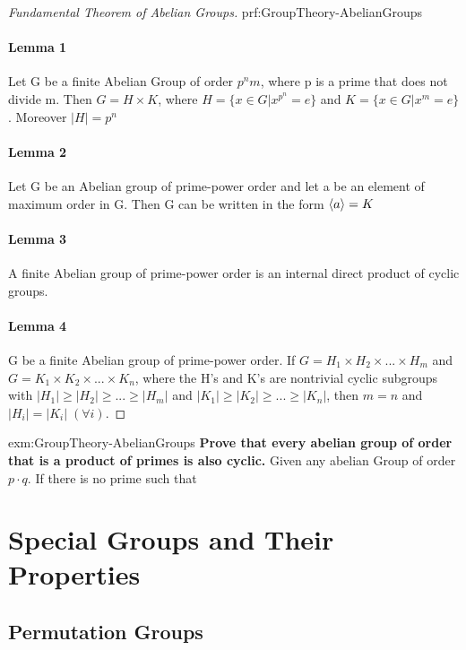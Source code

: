 \begin{proof}[Fundamental Theorem of Abelian Groups]{prf:GroupTheory-AbelianGroups}
    \paragraph{Lemma 1} Let G be a finite Abelian Group of order $p^n m$, where p is a prime that does not divide m. Then $ G = H \times K $, where $ H = \{ x \in G | x^{p^n} = e \} $ and $ K = \{ x \in G | x^{m} = e \} $. Moreover $ |H| = p^n $
    \paragraph{Lemma 2} Let G be an Abelian group of prime-power order and let a be an element of maximum order in G. Then G can be written in the form $\braket{a} = K$
    \paragraph{Lemma 3} A finite Abelian group of prime-power order is an internal direct product of cyclic groups.
    \paragraph{Lemma 4} G be a finite Abelian group of prime-power order. If $ G = H_1 \times H_2 \times ... \times H_m$ and $G = K_1 \times K_2 \times ... \times K_n $, where the H’s and K’s are nontrivial cyclic subgroups with $|H_1| \geq |H_2| \geq ... \geq |H_m| $ and $ |K_1| \geq |K_2| \geq ... \geq |K_n| $, then $m = n$ and $|H_i| = |K_i| \; (\forall i)$.
\end{proof}

\begin{example}{exm:GroupTheory-AbelianGroups}
    \textbf{Prove that every abelian group of order that is a product of primes is also cyclic.}
    Given any abelian Group of order $ p \cdot q $. If there is no prime such that 
\end{example}



\section{Special Groups and Their Properties}

\subsection{Permutation Groups}

